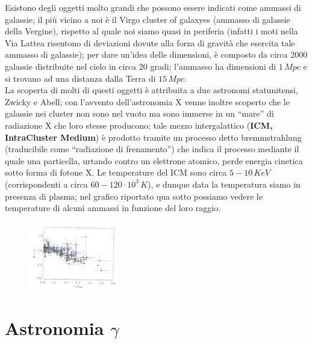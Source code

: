 Esistono degli oggetti molto grandi che possono essere indicati come ammassi di galassie; il più vicino a noi è il Virgo cluster of galaxyes (ammasso di galassie della Vergine), rispetto al quale noi siamo quasi in periferia (infatti i moti nella Via Lattea risentono di deviazioni dovute alla forza di gravità che esercita tale ammasso di galassie); per dare un'idea delle dimensioni, è composto da circa 2000 galassie distribuite nel cielo in circa 20 gradi; l'ammasso ha dimensioni di $1 \, Mpc$ e si trovano ad una distanza dalla Terra di $15 \, Mpc$.\\
La scoperta di molti di questi oggetti è attribuita a due astronomi statunitensi, Zwicky e Abell; con l'avvento dell'astronomia X venne inoltre scoperto che le galassie nei cluster non sono nel vuoto ma sono immerse in un ``mare'' di radiazione X che loro stesse producono; tale mezzo intergalattico (\textbf{ICM, IntraCluster Medium}) è prodotto tramite un processo detto bremmstrahlung (traducibile come ``radiazione di frenamento'') che indica il processo mediante il quale una particella, urtando contro un elettrone atomico, perde energia cinetica sotto forma di fotone X. Le temperature del ICM sono circa $5-10 \, KeV$ (corrispondenti a circa $60-120 \cdot 10^3 \, K$), e dunque data la temperatura siamo in presenza di plasma; nel grafico  riportato qua sotto possiamo vedere le temperature di alcuni ammassi in funzione del loro raggio.

\begin{figure}[h!]
	\centering
	\includegraphics[width=0.35\textwidth]{Img/bertin_12.png}
\end{figure}

\section{Astronomia $\gamma$}

